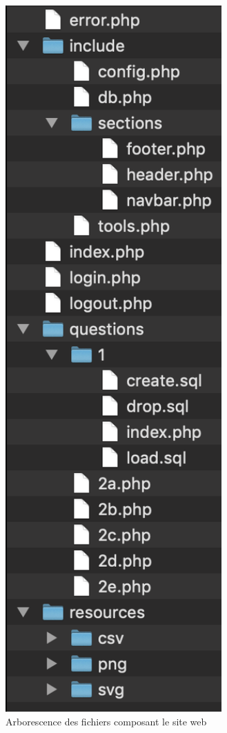 \documentclass[a4paper, 12pt]{article}
\begin{document}
	\begin{figure}[H]
	    \centering
	    \includegraphics[scale=0.6]{resources/pdf/arborescence.pdf}
	    \caption{Arborescence des fichiers composant le site web}
	    \label{fig:arborescence}
	\end{figure}
\end{document}
